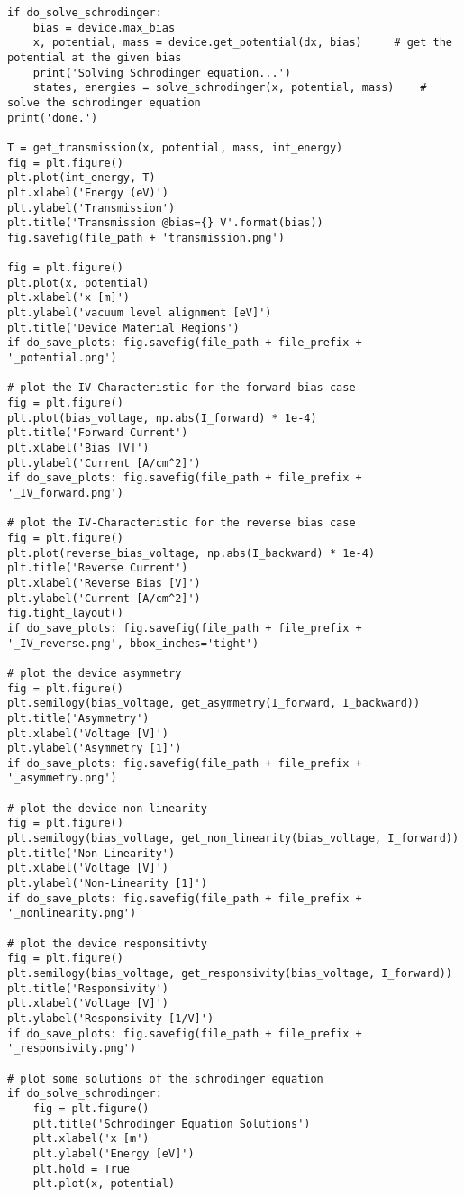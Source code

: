 \begin{lstlisting}
if do_solve_schrodinger:
    bias = device.max_bias
    x, potential, mass = device.get_potential(dx, bias)     # get the potential at the given bias
    print('Solving Schrodinger equation...')
    states, energies = solve_schrodinger(x, potential, mass)    # solve the schrodinger equation
print('done.')

T = get_transmission(x, potential, mass, int_energy)
fig = plt.figure()
plt.plot(int_energy, T)
plt.xlabel('Energy (eV)')
plt.ylabel('Transmission')
plt.title('Transmission @bias={} V'.format(bias))
fig.savefig(file_path + 'transmission.png')

fig = plt.figure()
plt.plot(x, potential)
plt.xlabel('x [m]')
plt.ylabel('vacuum level alignment [eV]')
plt.title('Device Material Regions')
if do_save_plots: fig.savefig(file_path + file_prefix + '_potential.png')

# plot the IV-Characteristic for the forward bias case
fig = plt.figure()
plt.plot(bias_voltage, np.abs(I_forward) * 1e-4)
plt.title('Forward Current')
plt.xlabel('Bias [V]')
plt.ylabel('Current [A/cm^2]')
if do_save_plots: fig.savefig(file_path + file_prefix + '_IV_forward.png')

# plot the IV-Characteristic for the reverse bias case
fig = plt.figure()
plt.plot(reverse_bias_voltage, np.abs(I_backward) * 1e-4)
plt.title('Reverse Current')
plt.xlabel('Reverse Bias [V]')
plt.ylabel('Current [A/cm^2]')
fig.tight_layout()
if do_save_plots: fig.savefig(file_path + file_prefix + '_IV_reverse.png', bbox_inches='tight')

# plot the device asymmetry
fig = plt.figure()
plt.semilogy(bias_voltage, get_asymmetry(I_forward, I_backward))
plt.title('Asymmetry')
plt.xlabel('Voltage [V]')
plt.ylabel('Asymmetry [1]')
if do_save_plots: fig.savefig(file_path + file_prefix + '_asymmetry.png')

# plot the device non-linearity
fig = plt.figure()
plt.semilogy(bias_voltage, get_non_linearity(bias_voltage, I_forward))
plt.title('Non-Linearity')
plt.xlabel('Voltage [V]')
plt.ylabel('Non-Linearity [1]')
if do_save_plots: fig.savefig(file_path + file_prefix + '_nonlinearity.png')

# plot the device responsitivty
fig = plt.figure()
plt.semilogy(bias_voltage, get_responsivity(bias_voltage, I_forward))
plt.title('Responsivity')
plt.xlabel('Voltage [V]')
plt.ylabel('Responsivity [1/V]')
if do_save_plots: fig.savefig(file_path + file_prefix + '_responsivity.png')

# plot some solutions of the schrodinger equation
if do_solve_schrodinger:
    fig = plt.figure()
    plt.title('Schrodinger Equation Solutions')
    plt.xlabel('x [m')
    plt.ylabel('Energy [eV]')
    plt.hold = True
    plt.plot(x, potential)


\end{lstlisting}
